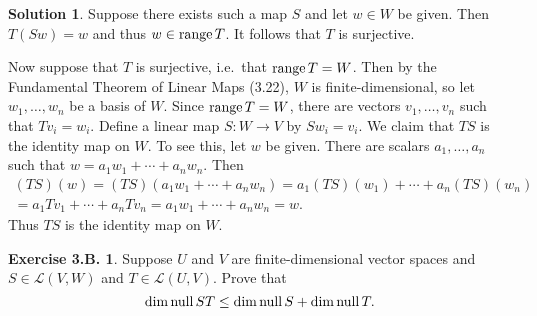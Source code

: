 \documentclass[12pt]{article}
\theoremstyle{definition}
\theoremstyle{exercise}
\newtheorem{exercise}{Exercise 3.B.}
\theoremstyle{solution}
\newtheorem*{solution}{Solution}
\newcommand{\lmap}{\mathcal{L}}
\newcommand{\Null}{\text{null\,}}
\newcommand{\Range}{\text{range\,}}
\begin{document}
\begin{solution}
    Suppose there exists such a map \( S \) and let \( w \in W \) be given. Then \( T(Sw) = w \) and thus \( w \in \Range T \). It follows that \( T \) is surjective.

    Now suppose that \( T \) is surjective, i.e.\ that \( \Range T = W \). Then by the Fundamental Theorem of Linear Maps (3.22), \( W \) is finite-dimensional, so let \( w_1, \ldots, w_n \) be a basis of \( W \). Since \( \Range T = W \), there are vectors \( v_1, \ldots, v_n \) such that \( Tv_i = w_i \). Define a linear map \( S : W \to V \) by \( Sw_i = v_i \). We claim that \( TS \) is the identity map on \( W \). To see this, let \( w \) be given. There are scalars \( a_1, \ldots, a_n \) such that \( w = a_1 w_1 + \cdots + a_n w_n \). Then
    \begin{multline*}
        (TS)(w) = (TS)(a_1 w_1 + \cdots + a_n w_n) = a_1 (TS)(w_1) + \cdots + a_n (TS)(w_n) \\ = a_1 Tv_1 + \cdots + a_n Tv_n = a_1 w_1 + \cdots + a_n w_n = w.
    \end{multline*}
    Thus \( TS \) is the identity map on \( W \).
\end{solution}

\begin{exercise}
\label{ex:22}
    Suppose \( U \) and \( V \) are finite-dimensional vector spaces and \( S \in \lmap(V, W) \) and \( T \in \lmap(U, V) \). Prove that
    \[
        \dim \Null ST \leq \dim \Null S + \dim \Null T.
    \]
\end{exercise}
\end{document}

